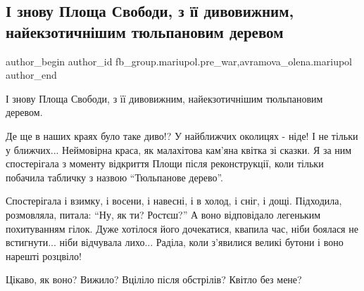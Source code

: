  
 
 
 
 

\subsection{І знову Площа Свободи, з її дивовижним, найекзотичнішим тюльпановим деревом}
\label{sec:05_02_2023.fb.fb_group.mariupol.pre_war.5.__znovu_ploshcha_svo}
 
\ifcmt
 author_begin
   author_id fb_group.mariupol.pre_war,avramova_olena.mariupol
 author_end
\fi

І знову Площа Свободи, з її дивовижним, найекзотичнішим тюльпановим деревом. 

Де ще в наших краях було таке диво!? У найближчих околицях - ніде! І не тільки
у ближчих...  Неймовірна краса, як малахітова кам'яна квітка зі сказки. Я за
ним спостерігала з моменту відкриття Площи після реконструкції, коли тільки
побачила табличку з назвою \enquote{Тюльпанове дерево}.

Спостерігала і взимку, і восени, і навесні, і в холод, і сніг, і дощі.
Підходила, розмовляла, питала: \enquote{Ну, як ти? Ростєш?}  А воно відповідало
легеньким похитуванням гілок. Дуже хотілося його дочекатися, квапила час, ніби
боялася не встигнути... ніби відчувала лихо... Раділа, коли з'явилися великі
бутони і воно нарешті розцвіло! 

Цікаво, як воно? Вижило? Вціліло після обстрілів? Квітло без мене?

